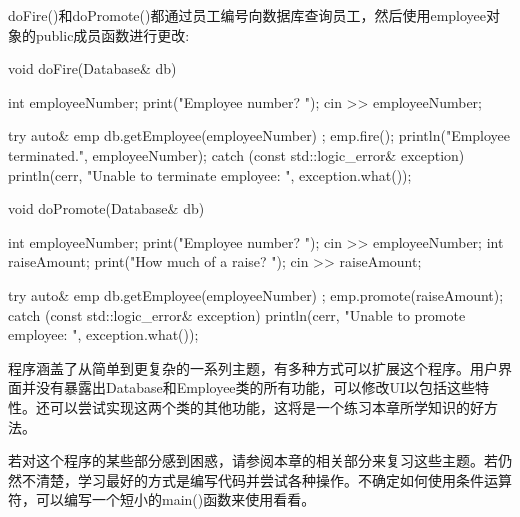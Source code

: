 doFire()和doPromote()都通过员工编号向数据库查询员工，然后使用employee对象的public成员函数进行更改:

\begin{cpp}
void doFire(Database& db)
{
    int employeeNumber;
    print("Employee number? ");
    cin >> employeeNumber;

    try {
        auto& emp { db.getEmployee(employeeNumber) };
        emp.fire();
        println("Employee {} terminated.", employeeNumber);
    } catch (const std::logic_error& exception) {
        println(cerr, "Unable to terminate employee: {}", exception.what());
    }
}

void doPromote(Database& db)
{
    int employeeNumber;
    print("Employee number? ");
    cin >> employeeNumber;
    int raiseAmount;
    print("How much of a raise? ");
    cin >> raiseAmount;

    try {
        auto& emp { db.getEmployee(employeeNumber) };
        emp.promote(raiseAmount);
    } catch (const std::logic_error& exception) {
        println(cerr, "Unable to promote employee: {}", exception.what());
    }
}
\end{cpp}


程序涵盖了从简单到更复杂的一系列主题，有多种方式可以扩展这个程序。用户界面并没有暴露出Database和Employee类的所有功能，可以修改UI以包括这些特性。还可以尝试实现这两个类的其他功能，这将是一个练习本章所学知识的好方法。

若对这个程序的某些部分感到困惑，请参阅本章的相关部分来复习这些主题。若仍然不清楚，学习最好的方式是编写代码并尝试各种操作。不确定如何使用条件运算符，可以编写一个短小的main()函数来使用看看。




